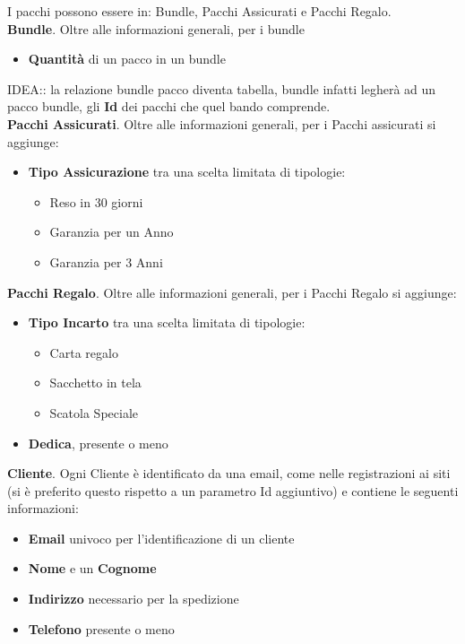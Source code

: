 I pacchi possono essere in: Bundle, Pacchi Assicurati e Pacchi Regalo.\\
\textbf{Bundle}. Oltre alle informazioni generali, per i bundle
\begin{itemize}
    \setlength{\itemindent}{+.5in}
        \item \textbf{Quantità} di un pacco in un bundle
\end{itemize}
IDEA:: la relazione bundle pacco diventa tabella, bundle infatti legherà ad un pacco bundle, gli \textbf{Id} dei pacchi che quel bando comprende.\\
\textbf{Pacchi Assicurati}. Oltre alle informazioni generali, per i Pacchi assicurati si aggiunge:
\begin{itemize}
    \setlength{\itemindent}{+.5in}
    \item \textbf{Tipo Assicurazione} tra una scelta limitata di tipologie:
        \begin{itemize}
            \setlength{\itemindent}{+.5in}
            \item Reso in 30 giorni
            \item Garanzia per un Anno
            \item Garanzia per 3 Anni
        \end{itemize}
\end{itemize}

\textbf{Pacchi Regalo}. Oltre alle informazioni generali, per i Pacchi Regalo si aggiunge:
\begin{itemize}
    \setlength{\itemindent}{+.5in}
    \item \textbf{Tipo Incarto} tra una scelta limitata di tipologie:
        \begin{itemize}
            \setlength{\itemindent}{+.5in}
            \item Carta regalo
            \item Sacchetto in tela
            \item Scatola Speciale
        \end{itemize}
    \item \textbf{Dedica}, presente o meno
\end{itemize}

\textbf{Cliente}. Ogni Cliente è identificato da una email, come nelle registrazioni ai siti (si è preferito questo rispetto a un parametro Id aggiuntivo) e contiene le seguenti
informazioni:
\begin{itemize}
    \setlength{\itemindent}{+.5in}
    \item \textbf{Email} univoco per l'identificazione di un cliente
    \item \textbf{Nome} e un \textbf{Cognome}
    \item \textbf{Indirizzo} necessario per la spedizione
    \item \normalsize{\textbf{Telefono}} presente o meno
\end{itemize}


